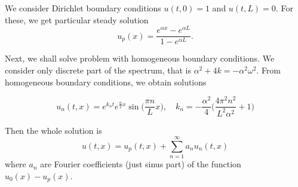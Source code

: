 We consider Dirichlet boundary conditions $u(t,0)=1$ and $u(t,L)=0$. For these, we get particular steady solution
\[
  u_p(x) = \frac{e^{\alpha x} - e^{\alpha L}}{1-e^{\alpha L}}.
\]

Next, we shall solve problem with homogeneous boundary conditions. We consider only discrete part of the spectrum, that is 
$\alpha^2 +4k = -\alpha^2\omega^2$. From homogeneous boundary conditions, we obtain solutions

\[
   u_n(t,x) = e^{k_n t} e^{\frac{\alpha}{2} x} \sin\big( \frac{\pi n}{L} x \big),\quad k_n = -\frac{\alpha^2}{4}\big(\frac{4\pi^2n^2}{L^2\alpha^2} +1 \big)
\]

Then the whole solution is
\[
  u(t,x) = u_p(t,x) + \sum_{n=1}^{\infty} a_n u_n(t,x)
\]
where $a_n$ are Fourier coefficients (just sinus part) of the function $u_0(x) - u_p(x)$.















